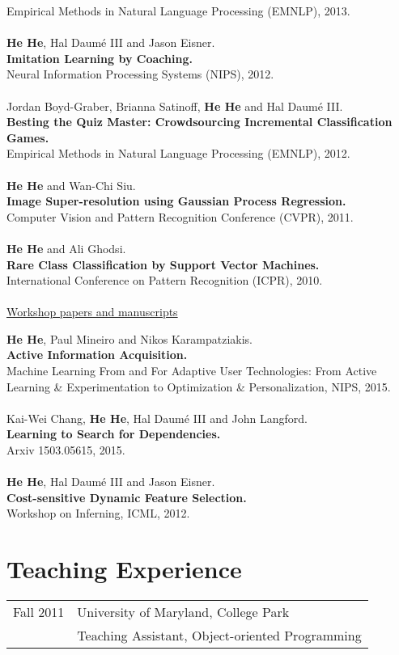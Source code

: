 \documentclass[a4paper,11pt]{article}
\begin{document}
Empirical Methods in Natural Language Processing (EMNLP), 2013.\\
\\
{\bf He He}, Hal Daum\'e III and Jason Eisner.\\
{\bf Imitation Learning by Coaching.}\\ 
Neural Information Processing Systems (NIPS), 2012.\\
\\
Jordan Boyd-Graber, Brianna Satinoff, {\bf He He} and Hal Daum\'e III.\\
{\bf Besting the Quiz Master: Crowdsourcing Incremental Classification Games.}\\
Empirical Methods in Natural Language Processing (EMNLP), 2012.\\
\\
{\bf He He} and Wan-Chi Siu. \\
{\bf Image Super-resolution using Gaussian Process Regression.}\\
Computer Vision and Pattern Recognition Conference (CVPR), 2011.\\
\\
{\bf He He} and Ali Ghodsi. \\
{\bf Rare Class Classification by Support Vector Machines.}\\
International Conference on Pattern Recognition (ICPR), 2010.\\
\\
{\underline{Workshop papers and manuscripts}}

{\bf He He}, Paul Mineiro and Nikos Karampatziakis. \\
{\bf Active Information Acquisition.}\\
Machine Learning From and For Adaptive User Technologies: From Active Learning \& Experimentation to Optimization \& Personalization, NIPS, 2015.\\
\\
Kai-Wei Chang, {\bf He He}, Hal Daum\'e III and John Langford.\\
{\bf Learning to Search for Dependencies.}\\
Arxiv 1503.05615, 2015.\\
\\
{\bf He He}, Hal Daum\'e III and Jason Eisner.\\
{\bf Cost-sensitive Dynamic Feature Selection.}\\
Workshop on Inferning, ICML, 2012.

\section{Teaching Experience} 
\begin{tabular}{rl}
Fall 2011 & University of Maryland, College Park\\
& Teaching Assistant, Object-oriented Programming
\end{tabular}
\end{document}
